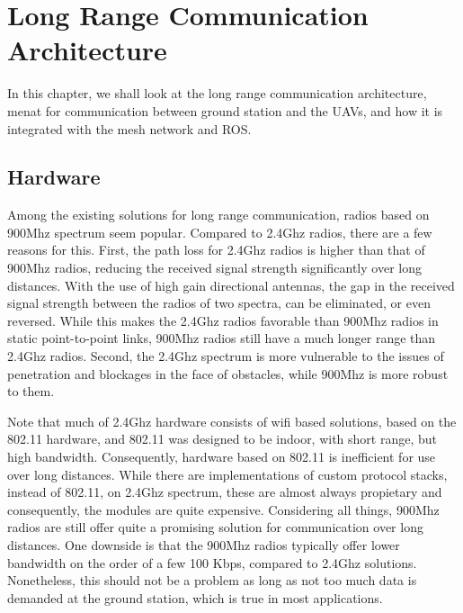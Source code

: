 
\chapter{Long Range Communication Architecture} %

\label{Chapter3} %


In this chapter, we shall look at the long range communication architecture, menat for communication between ground station and the UAVs, and how it is integrated with the mesh network and ROS.

\section{Hardware}
Among the existing solutions for long range communication, radios based on 900Mhz spectrum seem popular. Compared to 2.4Ghz radios, there are a few reasons for this. First, the path loss for 2.4Ghz radios is higher than that of 900Mhz radios, reducing the received signal strength significantly over long distances. With the use of high gain directional antennas, the gap in the received signal strength between the radios of two spectra, can be eliminated, or even reversed. While this makes the 2.4Ghz radios favorable than 900Mhz radios in static point-to-point links, 900Mhz radios still have a much longer range than 2.4Ghz radios. Second, the 2.4Ghz spectrum is more vulnerable to the issues of penetration and blockages in the face of obstacles, while 900Mhz is more robust to them.

Note that much of 2.4Ghz hardware consists of wifi based solutions, based on the 802.11 hardware, and 802.11 was designed to be indoor, with short range, but high bandwidth. Consequently, hardware based on 802.11 is inefficient for use over long distances. While there are implementations of custom protocol stacks, instead of 802.11, on 2.4Ghz spectrum, these are almost always propietary and consequently, the modules are quite expensive. Considering all things, 900Mhz radios are still offer quite a promising solution for communication over long distances. One downside is that the 900Mhz radios typically offer lower bandwidth on the order of a few 100 Kbps, compared to 2.4Ghz solutions. Nonetheless, this should not be a problem as long as not too much data is demanded at the ground station, which is true in most applications.

